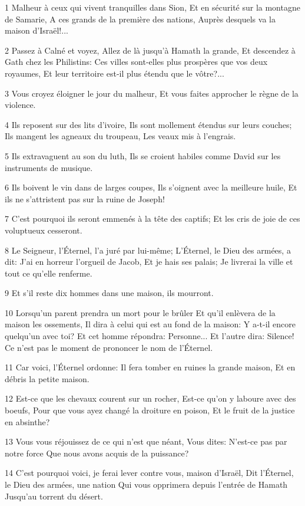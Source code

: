 \par 1 Malheur à ceux qui vivent tranquilles dans Sion, Et en sécurité sur la montagne de Samarie, A ces grands de la première des nations, Auprès desquels va la maison d'Israël!...
\par 2 Passez à Calné et voyez, Allez de là jusqu'à Hamath la grande, Et descendez à Gath chez les Philistins: Ces villes sont-elles plus prospères que vos deux royaumes, Et leur territoire est-il plus étendu que le vôtre?...
\par 3 Vous croyez éloigner le jour du malheur, Et vous faites approcher le règne de la violence.
\par 4 Ils reposent sur des lits d'ivoire, Ils sont mollement étendus sur leurs couches; Ils mangent les agneaux du troupeau, Les veaux mis à l'engrais.
\par 5 Ils extravaguent au son du luth, Ils se croient habiles comme David sur les instruments de musique.
\par 6 Ils boivent le vin dans de larges coupes, Ils s'oignent avec la meilleure huile, Et ils ne s'attristent pas sur la ruine de Joseph!
\par 7 C'est pourquoi ils seront emmenés à la tête des captifs; Et les cris de joie de ces voluptueux cesseront.
\par 8 Le Seigneur, l'Éternel, l'a juré par lui-même; L'Éternel, le Dieu des armées, a dit: J'ai en horreur l'orgueil de Jacob, Et je hais ses palais; Je livrerai la ville et tout ce qu'elle renferme.
\par 9 Et s'il reste dix hommes dans une maison, ils mourront.
\par 10 Lorsqu'un parent prendra un mort pour le brûler Et qu'il enlèvera de la maison les ossements, Il dira à celui qui est au fond de la maison: Y a-t-il encore quelqu'un avec toi? Et cet homme répondra: Personne... Et l'autre dira: Silence! Ce n'est pas le moment de prononcer le nom de l'Éternel.
\par 11 Car voici, l'Éternel ordonne: Il fera tomber en ruines la grande maison, Et en débris la petite maison.
\par 12 Est-ce que les chevaux courent sur un rocher, Est-ce qu'on y laboure avec des boeufs, Pour que vous ayez changé la droiture en poison, Et le fruit de la justice en absinthe?
\par 13 Vous vous réjouissez de ce qui n'est que néant, Vous dites: N'est-ce pas par notre force Que nous avons acquis de la puissance?
\par 14 C'est pourquoi voici, je ferai lever contre vous, maison d'Israël, Dit l'Éternel, le Dieu des armées, une nation Qui vous opprimera depuis l'entrée de Hamath Jusqu'au torrent du désert.

